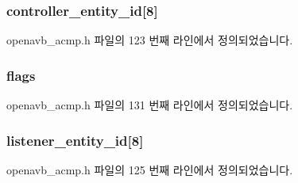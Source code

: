 \subsubsection[{\texorpdfstring{controller\+\_\+entity\+\_\+id}{controller_entity_id}}]{ controller\+\_\+entity\+\_\+id\mbox{[}8\mbox{]}}\hypertarget{structopenavb__acmp___a_c_m_p_command_response__t_a8b74ba582b9c19e1f2e475925f7cfb2f}{}\label{structopenavb__acmp___a_c_m_p_command_response__t_a8b74ba582b9c19e1f2e475925f7cfb2f}


openavb\+\_\+acmp.\+h 파일의 123 번째 라인에서 정의되었습니다.

\subsubsection[{\texorpdfstring{flags}{flags}}]{ flags}\hypertarget{structopenavb__acmp___a_c_m_p_command_response__t_a492b33861e809623846e5256d271bc78}{}\label{structopenavb__acmp___a_c_m_p_command_response__t_a492b33861e809623846e5256d271bc78}


openavb\+\_\+acmp.\+h 파일의 131 번째 라인에서 정의되었습니다.

\subsubsection[{\texorpdfstring{listener\+\_\+entity\+\_\+id}{listener_entity_id}}]{ listener\+\_\+entity\+\_\+id\mbox{[}8\mbox{]}}\hypertarget{structopenavb__acmp___a_c_m_p_command_response__t_adc2799f499bfc317ee7d3a9182d1c71f}{}\label{structopenavb__acmp___a_c_m_p_command_response__t_adc2799f499bfc317ee7d3a9182d1c71f}


openavb\+\_\+acmp.\+h 파일의 125 번째 라인에서 정의되었습니다.

